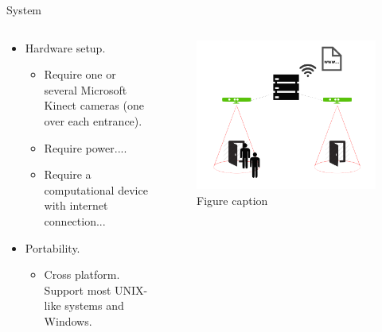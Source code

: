 \documentclass[final,hyperref={pdfpagelabels=false}]{beamer}
\begin{document}
\begin{frame}[t]
\begin{columns}[t]
\begin{column}{.465\textwidth}


\begin{block}{System}

	\begin{columns} %
		\begin{column}{.54\textwidth} %
			\begin{itemize}
				\item Hardware setup.
				\begin{itemize}
					\item Require one or several Microsoft Kinect cameras (one over each entrance).
					\item Require power....
					\item Require a computational device with internet connection...
				\end{itemize}
				\item Portability.
				\begin{itemize}
					\item Cross platform. Support most UNIX-like systems and Windows.
				\end{itemize}
			\end{itemize}
		\end{column}
			
		\begin{column}{.43\textwidth} %
			\centering
			\begin{figure}
				\includegraphics[width=1.0\linewidth]{system_overview.png}
				\caption{Figure caption}
			\end{figure}
		\end{column}
	\end{columns} %


\end{block}
\end{column}
\end{columns}
\end{frame}
\end{document}
